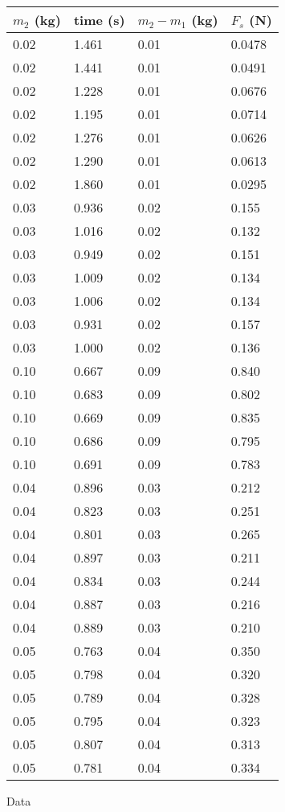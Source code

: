 \documentclass{article}
\begin{document}
\begin{figure}[ht]
    \centering
    \begin{tabular}{l|l|l|l}
        \toprule
        $m_2$ (\si{\kilogram}) & time (\si{\second}) & $m_2 - m_1$ (\si{\kilogram}) & $F_s$ (\si{\newton}) \\
        \midrule
        0.02 & 1.461 & 0.01 & 0.0478 \\
        0.02 & 1.441 & 0.01 & 0.0491 \\
        0.02 & 1.228 & 0.01 & 0.0676 \\
        0.02 & 1.195 & 0.01 & 0.0714 \\
        0.02 & 1.276 & 0.01 & 0.0626 \\
        0.02 & 1.290 & 0.01 & 0.0613 \\
        0.02 & 1.860 & 0.01 & 0.0295 \\
        0.03 & 0.936 & 0.02 & 0.155 \\
        0.03 & 1.016 & 0.02 & 0.132 \\
        0.03 & 0.949 & 0.02 & 0.151 \\
        0.03 & 1.009 & 0.02 & 0.134 \\
        0.03 & 1.006 & 0.02 & 0.134 \\
        0.03 & 0.931 & 0.02 & 0.157 \\
        0.03 & 1.000 & 0.02 & 0.136 \\
        0.10 & 0.667 & 0.09 & 0.840 \\
        0.10 & 0.683 & 0.09 & 0.802 \\
        0.10 & 0.669 & 0.09 & 0.835 \\
        0.10 & 0.686 & 0.09 & 0.795 \\
        0.10 & 0.691 & 0.09 & 0.783 \\
        0.04 & 0.896 & 0.03 & 0.212 \\
        0.04 & 0.823 & 0.03 & 0.251 \\
        0.04 & 0.801 & 0.03 & 0.265 \\
        0.04 & 0.897 & 0.03 & 0.211 \\
        0.04 & 0.834 & 0.03 & 0.244 \\
        0.04 & 0.887 & 0.03 & 0.216 \\
        0.04 & 0.889 & 0.03 & 0.210 \\
        0.05 & 0.763 & 0.04 & 0.350 \\
        0.05 & 0.798 & 0.04 & 0.320 \\
        0.05 & 0.789 & 0.04 & 0.328 \\
        0.05 & 0.795 & 0.04 & 0.323 \\
        0.05 & 0.807 & 0.04 & 0.313 \\
        0.05 & 0.781 & 0.04 & 0.334 \\
    \end{tabular}
    \caption{Data}
    \label{fig:data}
\end{figure}
\end{document}

